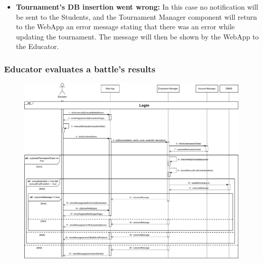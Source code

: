 \documentclass{article}
\begin{document}
{\begin{itemize}
            Tournament Manager component just return an error message to the WebApp stating 
            that the closure of the tournament has been denied since there is still at least
            one battle active within it. The message will be shown then to the Educator by the 
            WebApp.
            \item \textbf{Tournament's DB insertion went wrong:} In this case no 
            notification will be sent to the Students, and the Tournament Manager component will 
            return to the WebApp an error message stating that there was an error while 
            updating the tournament.
            The message will then be shown by the WebApp to the Educator.
        \end{itemize}


    \subsubsection{Educator evaluates a battle's results}
        \begin{figure}[H]
            \centering
            \hspace*{-3.1cm}\includegraphics[scale=0.55]{Sequence/Sequence8DD.pdf}
            \caption{}
            \label{fig:Sequence8DD}
        \end{figure}
        
}
\end{document}

